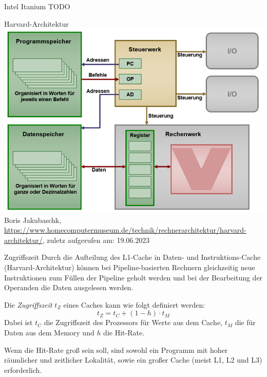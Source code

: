 \begin{example}[Cachehierarchie]{Intel Itanium}
    TODO
\end{example}

\begin{example}[Cachehierarchie]{Harvard-Architektur}
    \includegraphics[width=\textwidth]{images/harvard_architektur.png}
    Boris Jakubaschk, \url{https://www.homecomputermuseum.de/technik/rechnerarchitektur/harvard-architektur/}, zuletz aufgerufen am: 19.06.2023
\end{example}

\begin{defi}[Cache]{Zugriffszeit}
    Durch die Aufteilung des L1-Cache in Daten- und Instruktions-Cache (Harvard-Architektur) können bei Pipeline-basierten Rechnern gleichzeitig neue Instruktionen zum Füllen der Pipeline geholt werden und bei der Bearbeitung der Operanden die Daten ausgelesen werden.

    Die \emph{Zugriffszeit} $t_Z$ eines Caches kann wie folgt definiert werden:
    \[
        t_Z = t_{C} + (1 - h) \cdot t_{M}
    \]
    Dabei ist $t_C$ die Zugriffszeit des Prozessors für Werte aus dem Cache, $t_M$ die für Daten aus dem Memory und $h$ die Hit-Rate.

    Wenn die Hit-Rate groß sein soll, sind sowohl ein Programm mit hoher räumlicher und zeitlicher Lokalität, sowie ein großer Cache (meist L1, L2 und L3) erforderlich.
\end{defi}

